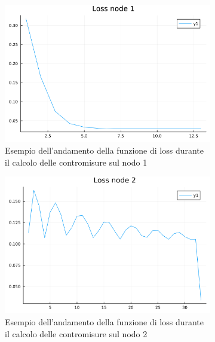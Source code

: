 \begin{figure}[H]
	\centering
	\begin{subfigure}[b]{0.45\textwidth}
		\centering
		\includegraphics[width=\textwidth]{img/loss1.png}
		\caption{Esempio dell'andamento della funzione di loss durante il calcolo delle contromisure sul nodo 1}
		\label{fig:loss1}
	\end{subfigure}
	\hfill
	\begin{subfigure}[b]{0.45\textwidth}
		\centering
		\includegraphics[width=\textwidth]{img/loss2.png}
		\caption{Esempio dell'andamento della funzione di loss durante il calcolo delle contromisure sul nodo 2}
		\label{fig:loss2}
	\end{subfigure}
	\hfill
	\begin{subfigure}[b]{0.45\textwidth}
		\centering

\end{subfigure}
\end{figure}
